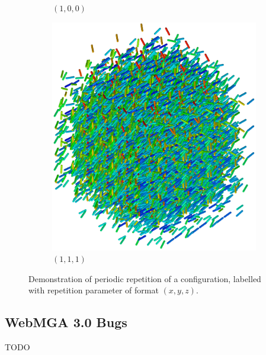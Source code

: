 \begin{figure}
\begin{center}
\begin{subfigure}{0.3\textwidth}
      \caption{$(1,0,0)$}
      \label{fig:periodic_2}
    \end{subfigure}
        \begin{subfigure}{0.3\textwidth}
      \includegraphics[width=\textwidth]{assets/images/periodic/3}
      \caption{$(1,1,1)$}
      \label{fig:periodic_3}
    \end{subfigure}
  \end{center}
  \caption{Demonstration of periodic repetition of a configuration, labelled with repetition parameter of format $(x, y, z)$.}
  \label{fig:periodic}
\end{figure}

\subsection{WebMGA 3.0 Bugs}
TODO
